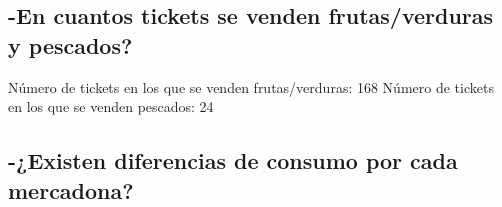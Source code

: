 \documentclass[,article,submit,moreauthors,pdftex]{Definitions/mdpi}
\begin{document}
\hypertarget{en-cuantos-tickets-se-venden-frutasverduras-y-pescados}{%
\subsection{-En cuantos tickets se venden frutas/verduras y
pescados?}\label{en-cuantos-tickets-se-venden-frutasverduras-y-pescados}}

Número de tickets en los que se venden frutas/verduras: 168 Número de
tickets en los que se venden pescados: 24

\hypertarget{existen-diferencias-de-consumo-por-cada-mercadona}{%
\subsection{-¿Existen diferencias de consumo por cada
mercadona?}\label{existen-diferencias-de-consumo-por-cada-mercadona}}
\end{document}
